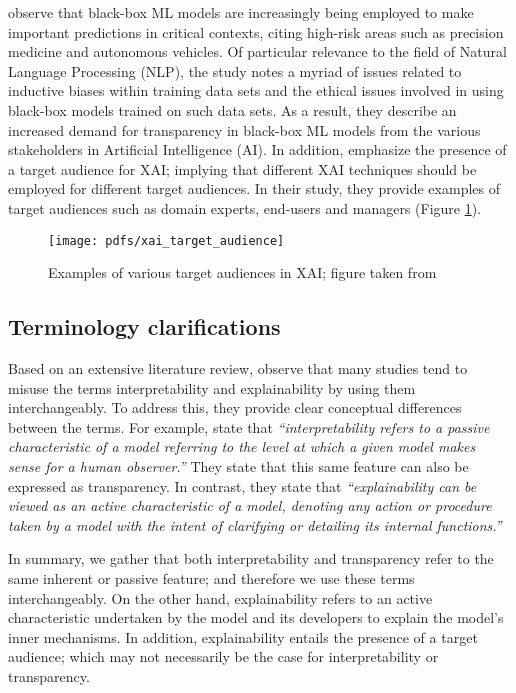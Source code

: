 \citet{arrieta2020explainable} observe that black-box ML models are increasingly being employed to make important predictions in critical contexts, citing high-risk areas such as precision medicine and autonomous vehicles. Of particular relevance to the field of Natural Language Processing (NLP), the study notes a myriad of issues related to inductive biases within training data sets and the ethical issues involved in using black-box models trained on such data sets. As a result, they describe an increased demand for transparency in black-box ML models from the various stakeholders in Artificial Intelligence (AI). In addition, \citet{arrieta2020explainable} emphasize the presence of a target audience for XAI; implying that different XAI techniques should be employed for different target audiences. In their study, they provide examples of target audiences such as domain experts, end-users and managers (Figure \ref{fig:xai-target-audience}).

\begin{figure}[t]
  \centering
  \texttt{[image: pdfs/xai\_target\_audience]}
  \caption{Examples of various target audiences in XAI; figure taken from \citet{arrieta2020explainable}}
  \label{fig:xai-target-audience}
\end{figure}

\subsection{Terminology clarifications}

\label{section:xai-terminology}

Based on an extensive literature review, \citet{arrieta2020explainable} observe that many studies tend to misuse the terms interpretability and explainability by using them interchangeably. To address this, they provide clear conceptual differences between the terms. For example, \citet{arrieta2020explainable} state that \textit{``interpretability refers to a passive characteristic of a model referring to the level at which a given model makes sense for a human observer.''} They state that this same feature can also be expressed as transparency. In contrast, they state that \textit{``explainability can be viewed as an active characteristic of a model, denoting any action or procedure taken by a model with the intent of clarifying or detailing its internal functions.''}

In summary, we gather that both interpretability and transparency refer to the same inherent or passive feature; and therefore we use these terms interchangeably. On the other hand, explainability refers to an active characteristic undertaken by the model and its developers to explain the model's inner mechanisms. In addition, explainability entails the presence of a target audience; which may not necessarily be the case for interpretability or transparency.

